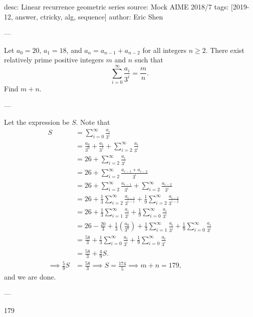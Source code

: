 desc: Linear recurrence geometric series
source: Mock AIME 2018/7
tags: [2019-12, answer, ctricky, alg, sequence]
author: Eric Shen

---

Let $a_0=20$, $a_1=18$, and $a_n=a_{n-1}+a_{n-2}$ for all integers $n\ge 2$. There exist relatively prime positive integers $m$ and $n$ such that \[\sum_{i=0}^\infty \frac{a_i}{3^i}=\frac mn.\]
Find $m+n$.

---

Let the expression be $S$. Note that
\begin{align*}
S&=\sum_{i=0}^\infty \frac{a_i}{3^i} \\
&=\frac{a_0}{3^0}+\frac{a_1}{3^1}+\sum_{i=2}^\infty \frac{a_i}{3^i} \\
&=26+\sum_{i=2}^\infty \frac{a_i}{3^i} \\
&=26+\sum_{i=2}^\infty \frac{a_{i-1}+a_{i-2}}{3^i} \\
&=26+\sum_{i=2}^\infty \frac{a_{i-1}}{3^i}+\sum_{i=2}^\infty \frac{a_{i-2}}{3^i} \\
&=26+\frac{1}{3}\sum_{i=2}^\infty \frac{a_{i-1}}{3^{i-1}}+\frac{1}{9}\sum_{i=2}^\infty \frac{a_{i-2}}{3^{i-2}} \\
&=26+\frac{1}{3}\sum_{i=1}^\infty \frac{a_i}{3^i}+\frac{1}{9}\sum_{i=0}^\infty \frac{a_i}{3^i} \\
&=26-\frac{20}{3}+\frac{1}{3}\left(\frac{a_0}{3^0}\right)+\frac{1}{3}\sum_{i=1}^\infty \frac{a_i}{3^i}+\frac{1}{9}\sum_{i=0}^\infty \frac{a_i}{3^i} \\
&=\frac{58}{3}+\frac{1}{3}\sum_{i=0}^\infty \frac{a_i}{3^i}+\frac{1}{9}\sum_{i=0}^\infty \frac{a_i}{3^i} \\
&=\frac{58}{3}+\frac{4}{9}S. \\
\implies \frac{5}{9}S&=\frac{58}{3}\implies S=\frac{174}{5}\implies m+n=179,
\end{align*}
and we are done.

---

179
